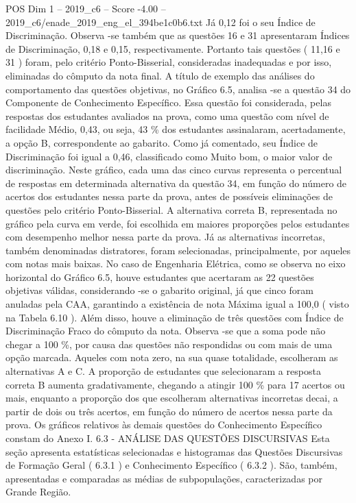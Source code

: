 \begin{textsample}{POS Dim 1 – 2019\_c6 – Score -4.00 – 2019\_c6/enade\_2019\_eng\_el\_394be1c0b6.txt}
Já 0,12 foi o seu Índice de Discriminação.
Observa -se também que as questões 16 e 31 apresentaram Índices de Discriminação, 0,18 e 0,15, respectivamente.
Portanto tais questões ( 11,16 e 31 ) foram, pelo critério Ponto-Bisserial, consideradas inadequadas e por isso, eliminadas do cômputo da nota final.
A título de exemplo das análises do comportamento das questões objetivas, no Gráfico 6.5, analisa -se a questão 34 do Componente de Conhecimento Específico.
Essa questão foi considerada, pelas respostas dos estudantes avaliados na prova, como uma questão com nível de facilidade Médio, 0,43, ou seja, 43 \% dos estudantes assinalaram, acertadamente, a opção B, correspondente ao gabarito.
Como já comentado, seu Índice de Discriminação foi igual a 0,46, classificado como Muito bom, o maior valor de discriminação.
Neste gráfico, cada uma das cinco curvas representa o percentual de respostas em determinada alternativa da questão 34, em função do número de acertos dos estudantes nessa parte da prova, antes de possíveis eliminações de questões pelo critério Ponto-Bisserial.
A alternativa correta B, representada no gráfico pela curva em verde, foi escolhida em maiores proporções pelos estudantes com desempenho melhor nessa parte da prova.
Já as alternativas incorretas, também denominadas distratores, foram selecionadas, principalmente, por aqueles com notas mais baixas.
No caso de Engenharia Elétrica, como se observa no eixo horizontal do Gráfico 6.5, houve estudantes que acertaram as 22 questões objetivas válidas, considerando -se o gabarito original, já que cinco foram anuladas pela CAA, garantindo a existência de nota Máxima igual a 100,0 ( visto na Tabela 6.10 ).
Além disso, houve a eliminação de três questões com Índice de Discriminação Fraco do cômputo da nota.
Observa -se que a soma pode não chegar a 100 \%, por causa das questões não respondidas ou com mais de uma opção marcada.
Aqueles com nota zero, na sua quase totalidade, escolheram as alternativas A e C.
A proporção de estudantes que selecionaram a resposta correta B aumenta gradativamente, chegando a atingir 100 \% para 17 acertos ou mais, enquanto a proporção dos que escolheram alternativas incorretas decai, a partir de dois ou três acertos, em função do número de acertos nessa parte da prova.
Os gráficos relativos às demais questões do Conhecimento Específico constam do Anexo I. 6.3 - ANÁLISE DAS QUESTÕES DISCURSIVAS Esta seção apresenta estatísticas selecionadas e histogramas das Questões Discursivas de Formação Geral ( 6.3.1 ) e Conhecimento Específico ( 6.3.2 ).
São, também, apresentadas e comparadas as médias de subpopulações, caracterizadas por Grande Região.

\end{textsample}
